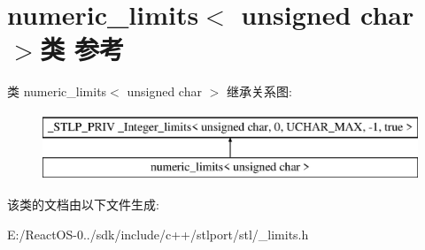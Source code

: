 \hypertarget{classnumeric__limits_3_01unsigned_01char_01_4}{}\section{numeric\+\_\+limits$<$ unsigned char $>$类 参考}
\label{classnumeric__limits_3_01unsigned_01char_01_4}
类 numeric\+\_\+limits$<$ unsigned char $>$ 继承关系图\+:\begin{figure}[H]
\begin{center}
\leavevmode
\includegraphics[height=2.000000cm]{classnumeric__limits_3_01unsigned_01char_01_4}
\end{center}
\end{figure}


该类的文档由以下文件生成\+:\begin{DoxyCompactItemize}
\item 
E\+:/\+React\+O\+S-\/0../sdk/include/c++/stlport/stl/\+\_\+limits.\+h\end{DoxyCompactItemize}
